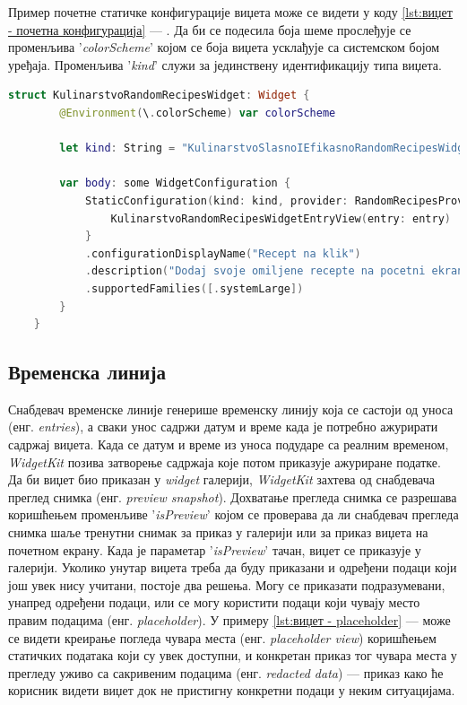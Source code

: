 \documentclass[12pt,oneside]{memoir}
\begin{document}
\indent Пример почетне статичке конфигурације виџета може се видети у коду \ref{lst:виџет - почетна конфигурација} --- . Да би се подесила боја шеме прослеђује се променљива '\textit{colorScheme}' којом се боја виџета усклађује са системском бојом уређаја. Променљива '\textit{kind}' служи за јединствену идентификацију типа виџета. 

\begin{lstlisting}[caption=\textit{{Виџет --- почетна конфигурација}}, label={lst:виџет - почетна конфигурација}, language=Swift, frame=single]
    struct KulinarstvoRandomRecipesWidget: Widget {
        @Environment(\.colorScheme) var colorScheme
        
        let kind: String = "KulinarstvoSlasnoIEfikasnoRandomRecipesWidget"
        
        var body: some WidgetConfiguration {
            StaticConfiguration(kind: kind, provider: RandomRecipesProvider()) { entry in
                KulinarstvoRandomRecipesWidgetEntryView(entry: entry)
            }
            .configurationDisplayName("Recept na klik")
            .description("Dodaj svoje omiljene recepte na pocetni ekran")
            .supportedFamilies([.systemLarge])
        }
    }
\end{lstlisting}

\subsection{Временска линија}
\label{subsec:Временска линија}
\indent Снабдевач временске линије генерише временску линију која се састоји од уноса (енг. \textit{entries}), а сваки унос садржи датум и време када је потребно ажурирати садржај виџета. Када се датум и време из уноса подударе са реалним временом, \textit{WidgetKit} позива затворење садржаја које потом приказује ажуриране податке. 
\\
\indent Да би виџет био приказан у \textit{widget} галерији, \textit{WidgetKit} захтева од снабдевача преглед снимка (енг. \textit{preview snapshot}). Дохватање прегледа снимка се разрешава коришћењем променљиве '\textit{isPreview}' којом се проверава да ли снабдевач прегледа снимка шаље тренутни снимак за приказ у галерији или за приказ виџета на почетном екрану. Када је параметар '\textit{isPreview}' тачан, виџет се приказује у галерији. Уколико унутар виџета треба да буду приказани и одређени подаци који још увек нису учитани, постоје два решења. Могу се приказати подразумевани, унапред одређени подаци, или се могу користити подаци који чувају место правим подацима (енг. \textit{placeholder}). У примеру \ref{lst:виџет - placeholder} ---  може се видети креирање погледа чувара места (енг. \textit{placeholder view}) коришћењем статичких података који су увек доступни, и конкретан приказ тог чувара места у прегледу уживо са сакривеним подацима (енг. \textit{redacted data}) --- приказ како ће корисник видети виџет док не пристигну конкретни подаци у неким ситуацијама.
\end{document}
